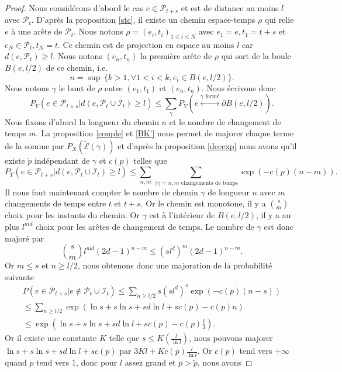 \documentclass[titlepage,a4paper,12pt]{article}
\newcounter{th}
\newcounter{propo}
\begin{document}
\begin{proof}
Nous considérons d'abord le cas $e\in \mathcal{P}_{t+s}$ et est de distance au moins $l$ avec $\mathcal{P}_t$.
D'après la proposition \ref{stc}, il existe un chemin espace-temps $\rho$ qui relie $e$ à une arête de $\mathcal{P}_t$. Nous notons $\rho= (e_i,t_i)_{1\leqslant i \leqslant N}$ avec $e_1 = e, t_1 = t+s$ et $e_N\in \mathcal{P}_t, t_N = t$. Ce chemin est de projection en espace au moins $l$ car $d(e,\mathcal{P}_t)\geqslant l$. Nous notons $(e_n,t_n)$ la première arête de $\rho$ qui sort de la boule $B(e,l/2)$ de ce chemin, i.e. 
$$ n = \sup\,\big\{k>1, \forall 1<i<k, e_i\in B(e,l/2) \big\}.
$$
Nous notons $\gamma$ le bout de $\rho$ entre $(e_1,t_1)$ et $(e_n,t_n)$.
Nous écrivons donc 
$$ P_Y(e\in \mathcal{P}_{t+s}|d(e,\mathcal{P}_t\cup \mathcal{I}_t)\geqslant l) \leqslant \sum_{\gamma}P_Y( e\overset{\gamma \text{ fermé}}{\longleftrightarrow} \partial B(e,l/2)).
$$
Nous fixons d'abord la longueur du chemin $n$ et le nombre de changement de temps $m$. La proposition \ref{couple} et \ref{BK'} nous permet de majorer chaque terme de la somme par $P_X(\tilde{\mathcal{E}}(\gamma))$ et d'après la proposition \ref{decexp} nous avons qu'il existe $\tilde{p}$ indépendant de $\gamma$ et $c(p)$ telles que 
$$P_Y(e\in \mathcal{P}_{t+s}|d(e,\mathcal{P}_t\cup \mathcal{I}_t)\geqslant l) \leqslant \sum_{n,m}\sum_{|\gamma| = n, m \text{ changements de temps}} \exp(-c(p)(n-m)).
$$
Il nous faut maintenant compter le nombre de chemin $\gamma$ de longueur $n$ avec $m$ changements de temps entre $t$ et $t+s$. Or le chemin est monotone, il y a $\displaystyle s \choose m$ choix pour les instants du chemin. Or $\gamma$ est à l'intérieur de $B(e,l/2)$, il y a au plus $l^{md}$ choix pour les arêtes de changement de temps. Le nombre de $\gamma$ est donc majoré par
$$ {s\choose m} l^{md} (2d-1)^{n-m}\leqslant (sl^d)^m(2d-1)^{n-m}.
$$
Or $m\leqslant s$ et $n\geqslant l/2$, nous obtenons donc une majoration de la probabilité suivante
\begin{multline*}P(e\in \mathcal{P}_{t+s}|e\notin \mathcal{P}_t\cup \mathcal{I}_t) \leqslant \sum_{n\geqslant l/2}s(sl^d)^s\exp(-c(p)(n-s))\\\leqslant \sum_{n\geqslant l/2} \exp(\ln s+s\ln s+sd\ln l +sc(p)-c(p)n)
\\ \leqslant \exp(\ln s+s\ln s+sd\ln l +sc(p) -c(p)\frac{l}{3}).
\end{multline*}
Or il existe une constante $K$ telle que $\displaystyle s \leqslant K(\frac{l}{\ln l})$, nous pouvons majorer $\ln s+s\ln s+sd\ln l +sc(p)$ par $\displaystyle 3Kl+Kc(p)\frac{l}{\ln l}$. Or $c(p)$ tend vers $+\infty$ quand $p$ tend vers $1$, donc pour $l$ assez grand et $p>\tilde{p}$, nous avons 

\end{proof}
\end{document}
